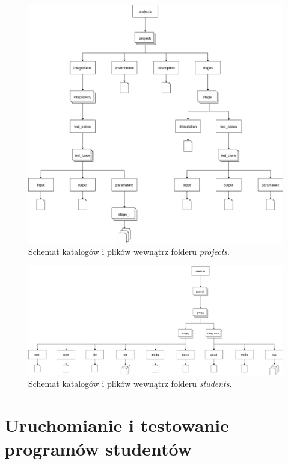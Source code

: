 \begin{figure}[H]
    \centering
    \includegraphics[width = 13cm]{chapter05/projects_dirs.png}
    \caption{Schemat katalogów i plików wewnątrz folderu \textit{projects}.}
    \label{fig:projects-directories}
\end{figure}

\begin{figure}[H]
    \centering
    \includegraphics[width = 13cm]{chapter05/students_dirs.png}
    \caption{Schemat katalogów i plików wewnątrz folderu \textit{students}.}
    \label{fig:students-directories}
\end{figure}

\section{Uruchomianie i testowanie programów studentów}
\label{run-and-test}

